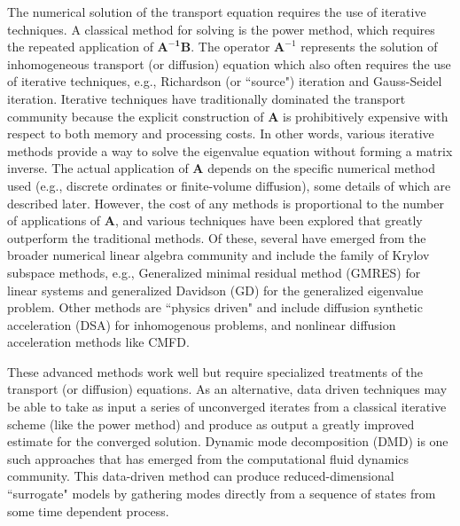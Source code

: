 The numerical solution of the transport equation requires the use of iterative techniques.
A classical method for solving  is the power method, which requires the repeated application of $\mathbf{A^{-1}B}$.
The operator $\mathbf{A}^{-1}$ represents the solution of inhomogeneous transport (or diffusion) equation which also often requires the use of iterative techniques, e.g., Richardson (or ``source") iteration and Gauss-Seidel iteration.
Iterative techniques have traditionally dominated the transport community because the explicit construction of $\mathbf{A}$ is prohibitively expensive with respect to both memory and processing costs.
In other words, various iterative methods provide a way to solve the eigenvalue equation without forming a matrix inverse.
The actual application of $\mathbf{A}$ depends on the specific numerical method used (e.g., discrete ordinates or finite-volume diffusion), some details of which are described later. 
However, the cost of any methods is proportional to the number of applications of $\mathbf{A}$, and various techniques have been explored that greatly outperform the traditional methods.
Of these, several have emerged from the broader numerical linear algebra community and include the family of Krylov subspace methods, e.g., Generalized minimal residual method (GMRES)\cite{saad1986gmres} for linear systems and generalized Davidson (GD)\cite{hamilton_numerical_2007} for the generalized eigenvalue problem.
Other methods are ``physics driven" and include diffusion synthetic acceleration (DSA) for inhomogenous problems\cite{Alcouffe_1977,roberts_multigroup_2014}, and nonlinear diffusion acceleration methods like CMFD\cite{smith_1983}.

These advanced methods work well but require specialized treatments of the transport (or diffusion) equations.
As an alternative, data driven techniques may be able to take as input a series of unconverged iterates from a classical iterative scheme (like the power method) and produce as output a greatly improved estimate for the converged solution.
Dynamic mode decomposition (DMD) is one such approaches that has emerged from the computational fluid dynamics community.
This data-driven method can produce reduced-dimensional ``surrogate" models by gathering modes directly from a sequence of states from some time dependent process.


